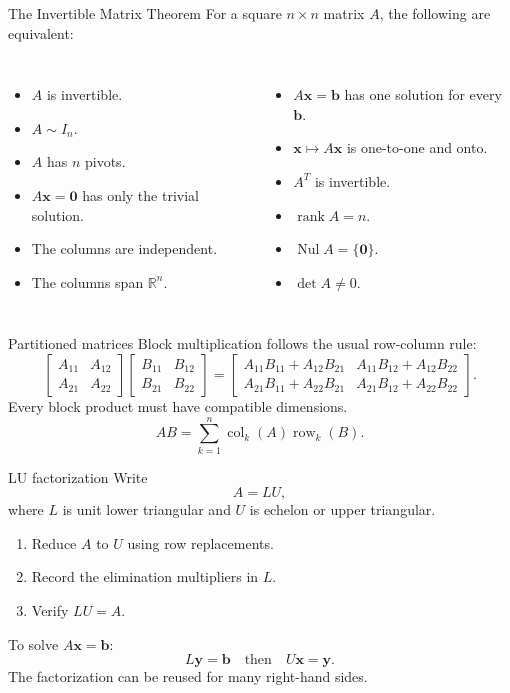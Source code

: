 \documentclass[aspectratio=169]{beamer}
\newcommand{\R}{\mathbb{R}}
\newcommand{\vect}[1]{\mathbf{#1}}
\newcommand{\Nul}{\operatorname{Nul}}
\newcommand{\rank}{\operatorname{rank}}
\begin{document}
\begin{frame}[shrink=7]{The Invertible Matrix Theorem}
For a square $n\times n$ matrix $A$, the following are equivalent:
\begin{columns}[T]
\begin{itemize}
  \item $A$ is invertible.
  \item $A\sim I_n$.
  \item $A$ has $n$ pivots.
  \item $A\vect x=\vect0$ has only the trivial solution.
  \item The columns are independent.
  \item The columns span $\R^n$.
\end{itemize}
\begin{itemize}
  \item $A\vect x=\vect b$ has one solution for every $\vect b$.
  \item $\vect x\mapsto A\vect x$ is one-to-one and onto.
  \item $A^T$ is invertible.
  \item $\rank A=n$.
  \item $\Nul A=\{\vect0\}$.
  \item $\det A\ne0$.
\end{itemize}
\end{columns}
\end{frame}

\begin{frame}{Partitioned matrices}
Block multiplication follows the usual row-column rule:
\[
\begin{bmatrix}A_{11}&A_{12}\\A_{21}&A_{22}\end{bmatrix}
\begin{bmatrix}B_{11}&B_{12}\\B_{21}&B_{22}\end{bmatrix}
=
\begin{bmatrix}
A_{11}B_{11}+A_{12}B_{21}&A_{11}B_{12}+A_{12}B_{22}\\
A_{21}B_{11}+A_{22}B_{21}&A_{21}B_{12}+A_{22}B_{22}
\end{bmatrix}.
\]
Every block product must have compatible dimensions.
\[
AB=\sum_{k=1}^{n}\operatorname{col}_k(A)\operatorname{row}_k(B).
\]
\end{frame}

\begin{frame}{LU factorization}
Write
\[
A=LU,
\]
where $L$ is unit lower triangular and $U$ is echelon or upper triangular.
\begin{enumerate}
  \item Reduce $A$ to $U$ using row replacements.
  \item Record the elimination multipliers in $L$.
  \item Verify $LU=A$.
\end{enumerate}
To solve $A\vect x=\vect b$:
\[
L\vect y=\vect b
\quad\text{then}\quad
U\vect x=\vect y.
\]
The factorization can be reused for many right-hand sides.
\end{frame}
\end{document}
